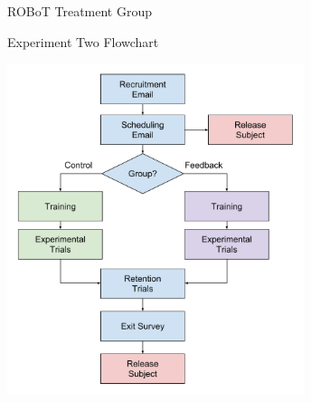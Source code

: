 \documentclass[10pt]{beamer}
\begin{document}
\begin{frame}[fragile]{ROBoT Treatment Group}
\begin{figure}
  \begin{center}


  \end{center}
\end{figure}
\end{frame}

\begin{frame}[fragile]{Experiment Two Flowchart}
  \begin{center}
    \includegraphics[width=0.65\textwidth]{../img/robot_flow.pdf}
  \end{center}
\end{frame}
\end{document}

